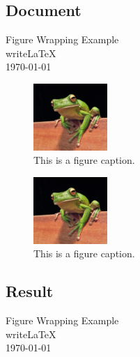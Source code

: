 \documentclass{article}
\begin{document}
\subsection*{Document}
\begin{latex}
{\centering
	{\Large Figure Wrapping Example}\\
	\vspace{5pt}
	{\large writeLaTeX}\\
	\vspace{5pt}
	\today\\
	\vspace{5pt}
}

\begin{figure}
	\centering
	\includegraphics[width=0.25\textwidth]{frog.jpg}
	\caption{\label{fig:frog1}This is a figure caption.}
\end{figure}

\lipsum[1]

\begin{figure}
	\centering
	\includegraphics[width=0.25\textwidth]{frog.jpg}
	\caption{\label{fig:frog2}This is a figure caption.}
\end{figure}

\lipsum[2-3]
\end{latex}

\clearpage
\subsection*{Result}
{\centering
{\Large Figure Wrapping Example}\\
\vspace{5pt}
{\large writeLaTeX}\\
\vspace{5pt}
\today\\
\vspace{5pt}
}
\end{document}
